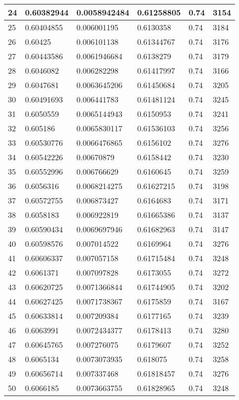 \begin{longtable}{|l|l|l|l|l|l|}
24 & 0.60382944 & 0.0058942484 & 0.61258805 & 0.74 & 3154 \\ \hline 
25 & 0.60404855 & 0.006001195 & 0.6130358 & 0.74 & 3184 \\ \hline 
26 & 0.60425 & 0.006101138 & 0.61344767 & 0.74 & 3176 \\ \hline 
27 & 0.60443586 & 0.0061946684 & 0.6138279 & 0.74 & 3179 \\ \hline 
28 & 0.6046082 & 0.006282298 & 0.61417997 & 0.74 & 3166 \\ \hline 
29 & 0.6047681 & 0.0063645206 & 0.61450684 & 0.74 & 3205 \\ \hline 
30 & 0.60491693 & 0.006441783 & 0.61481124 & 0.74 & 3245 \\ \hline 
31 & 0.6050559 & 0.0065144943 & 0.6150953 & 0.74 & 3241 \\ \hline 
32 & 0.605186 & 0.0065830117 & 0.61536103 & 0.74 & 3256 \\ \hline 
33 & 0.60530776 & 0.0066476865 & 0.6156102 & 0.74 & 3276 \\ \hline 
34 & 0.60542226 & 0.00670879 & 0.6158442 & 0.74 & 3230 \\ \hline 
35 & 0.60552996 & 0.006766629 & 0.6160645 & 0.74 & 3259 \\ \hline 
36 & 0.6056316 & 0.0068214275 & 0.61627215 & 0.74 & 3198 \\ \hline 
37 & 0.60572755 & 0.006873427 & 0.6164683 & 0.74 & 3171 \\ \hline 
38 & 0.6058183 & 0.006922819 & 0.61665386 & 0.74 & 3137 \\ \hline 
39 & 0.60590434 & 0.0069697946 & 0.61682963 & 0.74 & 3147 \\ \hline 
40 & 0.60598576 & 0.007014522 & 0.6169964 & 0.74 & 3276 \\ \hline 
41 & 0.60606337 & 0.007057158 & 0.61715484 & 0.74 & 3248 \\ \hline 
42 & 0.6061371 & 0.007097828 & 0.6173055 & 0.74 & 3272 \\ \hline 
43 & 0.60620725 & 0.0071366844 & 0.61744905 & 0.74 & 3202 \\ \hline 
44 & 0.60627425 & 0.0071738367 & 0.6175859 & 0.74 & 3167 \\ \hline 
45 & 0.60633814 & 0.007209384 & 0.6177165 & 0.74 & 3239 \\ \hline 
46 & 0.6063991 & 0.0072434377 & 0.6178413 & 0.74 & 3280 \\ \hline 
47 & 0.60645765 & 0.007276075 & 0.6179607 & 0.74 & 3252 \\ \hline 
48 & 0.6065134 & 0.0073073935 & 0.618075 & 0.74 & 3258 \\ \hline 
49 & 0.60656714 & 0.007337468 & 0.61818457 & 0.74 & 3276 \\ \hline 
50 & 0.6066185 & 0.0073663755 & 0.61828965 & 0.74 & 3248 \\ \hline 
\end{longtable}